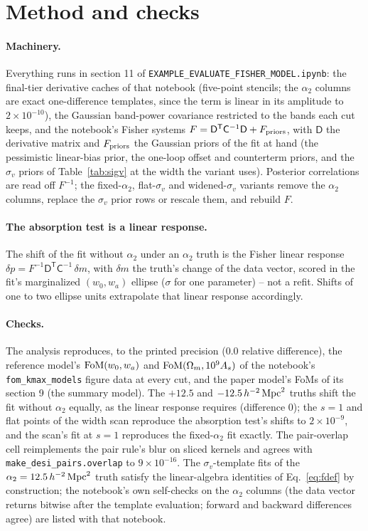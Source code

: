 \documentclass[11pt]{article}
\newcommand{\Cov}{\mathsf{C}}
\newcommand{\T}{^{\mathsf{T}}}
\newcommand{\aunit}{\,h^{-2}\,{\rm Mpc}^2}
\newcommand{\sv}{\sigma_v}
\newcommand{\us}{\_\allowbreak}
\begin{document}
\appendix

\section{Method and checks}
\label{app:method}

\paragraph{Machinery.}
Everything runs in section 11 of
\texttt{EXAMPLE\us EVALUATE\us FISHER\us MODEL.ipynb}: the final-tier
derivative caches of that notebook (five-point stencils; the
$\alpha_2$ columns are exact one-difference templates, since the term
is linear in its amplitude to $2\times10^{-10}$), the Gaussian
band-power covariance restricted to the bands each cut keeps, and the
notebook's Fisher systems
$F = \mathsf{D}\T\Cov^{-1}\mathsf{D} + F_{\rm priors}$,
with $\mathsf{D}$ the derivative matrix and $F_{\rm priors}$ the
Gaussian priors of the fit at hand (the pessimistic linear-bias
prior, the one-loop offset and counterterm priors, and the $\sv$
priors of Table~\ref{tab:sigv} at the width the variant uses).
Posterior correlations are read off $F^{-1}$; the fixed-$\alpha_2$,
flat-$\sv$ and widened-$\sv$ variants remove the $\alpha_2$ columns,
replace the $\sv$ prior rows or rescale them, and rebuild $F$.

\paragraph{The absorption test is a linear response.}
The shift of the fit without $\alpha_2$ under an $\alpha_2$ truth is
the Fisher linear response
$\delta p = F^{-1}\mathsf{D}\T\Cov^{-1}\,\delta m$, with $\delta m$
the truth's change of the data vector, scored in the fit's
marginalized $(w_0, w_a)$ ellipse ($\sigma$ for one parameter) -- not
a refit.  Shifts of one to two ellipse units extrapolate that linear
response accordingly.

\paragraph{Checks.}
The analysis reproduces, to the printed precision ($0.0$ relative
difference), the reference model's ${\rm FoM}(w_0, w_a)$ and
${\rm FoM}(\Omega_m, 10^9 A_s)$ of the notebook's
\texttt{fom\us kmax\us models} figure data at every cut, and the
paper model's FoMs of its section 9 (the summary model).  The
$+12.5$ and $-12.5\aunit$ truths shift the fit without $\alpha_2$
equally, as the linear response requires (difference $0$); the
$s = 1$ and flat points of the width scan reproduce the absorption
test's shifts to $2\times10^{-9}$, and the scan's fit at $s = 1$
reproduces the fixed-$\alpha_2$ fit exactly.  The pair-overlap cell
reimplements the pair rule's blur on sliced kernels and agrees with
\texttt{make\us desi\us pairs.overlap} to $9\times10^{-16}$.  The
$\sv$-template fits of the $\alpha_2 = 12.5\aunit$ truth satisfy
the linear-algebra identities of Eq.~\eqref{eq:fdef} by construction;
the notebook's own self-checks on the $\alpha_2$ columns (the data
vector returns bitwise after the template evaluation; forward and
backward differences agree) are listed with that notebook.
\end{document}
